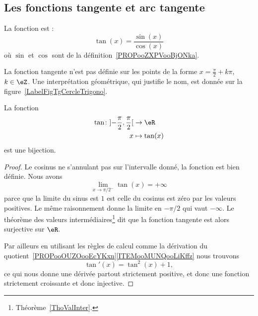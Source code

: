 	\subsection{Les fonctions tangente et arc tangente}

	\begin{definition}
		La fonction  est :
		\begin{equation}
			\tan(x)=\frac{ \sin(x) }{ \cos(x) }
		\end{equation}
		où \( \sin\) et \( \cos\) sont de la définition~\ref{PROPooZXPVooBjONka}.
	\end{definition}
	La fonction tangente n'est pas définie sur les points de la forme \( x=\frac{ \pi }{2}+k\pi\), \( k\in \eZ\). Une interprétation géométrique, qui justifie le nom, est donnée sur la figure~\ref{LabelFigTgCercleTrigono}.
	\newcommand{\CaptionFigTgCercleTrigono}{Interprétation géométrique de la fonction tangente. La tangente de l'angle $\theta$ est positive (et un peu plus grande que $1$) tandis que celle de la tangente de l'angle $\varphi$ est négative.}
	

	\begin{proposition}
		La fonction
		\begin{equation}
			\begin{aligned}
				\tan\colon \mathopen] -\frac{ \pi }{ 2 } , \frac{ \pi }{2} \mathclose[ & \to \eR         \\
				x                                                                      & \mapsto \tan(x)
			\end{aligned}
		\end{equation}
		est une bijection.
	\end{proposition}

	\begin{proof}
		Le cosinus ne s'annulant pas sur l'intervalle donné, la fonction est bien définie. Nous avons
		\begin{equation}
			\lim_{x\to \pi/2^-} \tan(x)=+\infty
		\end{equation}
		parce que la limite du sinus est \( 1\) est celle du cosinus est zéro par les valeurs positives. Le même raisonnement donne la limite en \( -\pi/2\) qui vaut \( -\infty\). Le théorème des valeurs intermédiaires\footnote{Théorème~\ref{ThoValInter}.} dit que la fonction tangente est alors surjective sur \( \eR\).

		Par ailleurs en utilisant les règles de calcul comme la dérivation du quotient~\ref{PROPooOUZOooEcYKxn}\ref{ITEMooMUNQooLiKffz} nous trouvons
		\begin{equation}
			\tan'(x)=\tan^2(x)+1,
		\end{equation}
		ce qui nous donne une dérivée partout strictement positive, et donc une fonction strictement croissante et donc injective.
	\end{proof}

